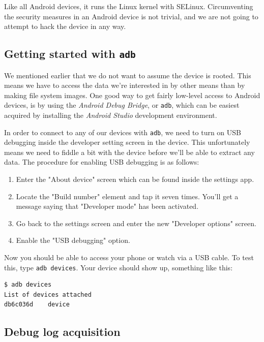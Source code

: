 \documentclass[a4paper,11pt,dvips]{article}
\begin{document}
Like all Android devices, it runs the Linux kernel with SELinux. Circumventing the security measures in an Android device is not trivial, and we are not going to attempt to hack the device in any way.


\subsection{Getting started with \texttt{adb}}

We mentioned earlier that we do not want to assume the device is rooted. This means we have to access the data we're interested in by other means than by making file system images. One good way to get fairly low-level access to Android devices, is by using the \textit{Android Debug Bridge}, or \texttt{adb}, which can be easiest acquired by installing the \textit{Android Studio} development environment.

In order to connect to any of our devices with \texttt{adb}, we need to turn on USB debugging inside the developer setting screen in the device. This unfortunately means we need to fiddle a bit with the device before we'll be able to extract any data. The procedure for enabling USB debugging is as follows:

\begin{enumerate}
\item Enter the "About device" screen which can be found inside the settings app.
\item Locate the "Build number" element and tap it seven times. You'll get a message saying that "Developer mode" has been activated.
\item Go back to the settings screen and enter the new "Developer options" screen.
\item Enable the "USB debugging" option.
\end{enumerate}

\noindent
Now you should be able to access your phone or watch via a USB cable. To test this, type \texttt{adb devices}. Your device should show up, something like this:

\scriptsize
\begin{verbatim}
$ adb devices
List of devices attached
db6c036d	device
\end{verbatim}
\normalsize


\subsection{Debug log acquisition}
\end{document}
